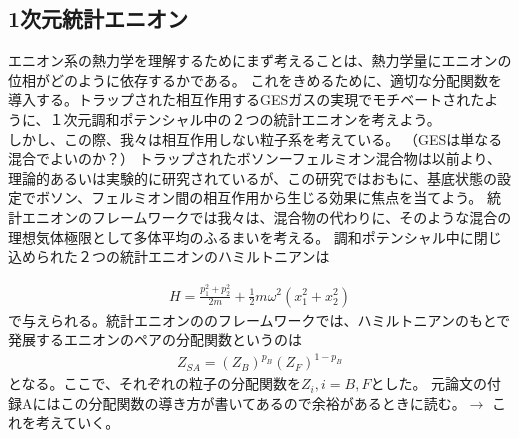 \documentclass[a4paper,11pt]{jsarticle}
\numberwithin{equation}{section}
\begin{document}
\subsection{1次元統計エニオン}
エニオン系の熱力学を理解するためにまず考えることは、熱力学量にエニオンの位相がどのように依存するかである。
これをきめるために、適切な分配関数を導入する。トラップされた相互作用するGESガスの実現でモチベートされたように、１次元調和ポテンシャル中の２つの統計エニオンを考えよう。\\
しかし、この際、我々は相互作用しない粒子系を考えている。
（GESは単なる混合でよいのか？）
トラップされたボソンーフェルミオン混合物は以前より、理論的あるいは実験的に研究されているが、この研究ではおもに、基底状態の設定でボソン、フェルミオン間の相互作用から生じる効果に焦点を当てよう。
統計エニオンのフレームワークでは我々は、混合物の代わりに、そのような混合の理想気体極限として多体平均のふるまいを考える。
調和ポテンシャル中に閉じ込められた２つの統計エニオンのハミルトニアンは

\begin{align}
H=\frac{p_1^2+p_2^2}{2m}+\frac{1}{2}m\omega^2(x_1^2+x_2^2)
\end{align}
で与えられる。統計エニオンののフレームワークでは、ハミルトニアンのもとで発展するエニオンのペアの分配関数というのは
\begin{align}
Z_{SA}=(Z_B)^{p_B}(Z_F)^{1-p_B}
\end{align}
となる。ここで、それぞれの粒子の分配関数を$Z_i,i=B,F$とした。
元論文の付録Aにはこの分配関数の導き方が書いてあるので余裕があるときに読む。$\rightarrow$ これを考えていく。
\end{document}
